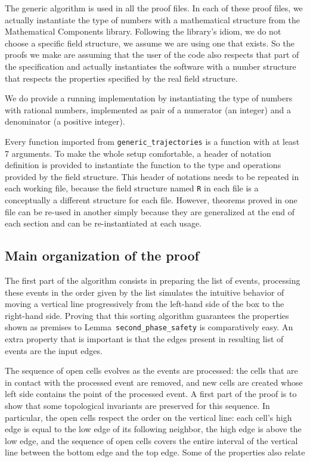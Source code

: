 \documentclass[a4paper, USenglish, cleveref, autoref, thm-restate]{lipics-v2021}
\begin{document}
The generic algorithm is used in all the proof files.  In each of
these proof files, we actually instantiate the type of numbers with
a mathematical structure from the {\sc Mathematical Components} library.
Following the library's idiom, we do not choose a specific field structure,
we assume we are using one that exists.  So the proofs we make are assuming
that the user of the code also respects that part of the specification and
actually instantiates the software with a number structure that respects the
properties specified by the real field structure.

We do provide a running implementation by instantiating the
type of numbers with rational numbers, implemented as pair of a numerator
(an integer) and a denominator (a positive integer).

Every function imported from {\tt generic\_trajectories} is a function
with at least 7 arguments.  To make the whole setup comfortable, a
header of notation definition is provided to instantiate the function
to the type and operations provided by the field structure.  This header of
notations needs to be repeated in each working file, because the field
structure named {\tt R} in each file is a conceptually a different structure
for each file.   However, theorems proved in one file can be re-used in another
simply because they are generalized at the end of each section and can be
re-instantiated at each usage.

\subsection{Main organization of the proof}
The first part of the algorithm consists in preparing the list of
events, processing these events in the order given by the list
simulates the intuitive behavior of moving a vertical line
progressively from the left-hand side of the box to the right-hand
side.  Proving that this sorting algorithm guarantees the properties
shown as premises to Lemma~{\tt second\_phase\_safety} is comparatively easy.
An extra property that is important is that the edges present in resulting
list of events are the input edges.

The sequence of open cells evolves as the events are processed: the cells
that are in contact with the processed event are removed, and new cells
are created whose left side contains the point of the processed event.  A
first part of the proof is to show that some topological invariants are
preserved for this sequence.  In particular, the open cells respect the
order on the vertical line: each cell's high edge is equal to the low edge
of its following neighbor, the high edge is above the low edge, and the
sequence of open cells covers the entire interval of the vertical line between
the bottom edge and the top edge.  Some of the properties also relate
\end{document}
